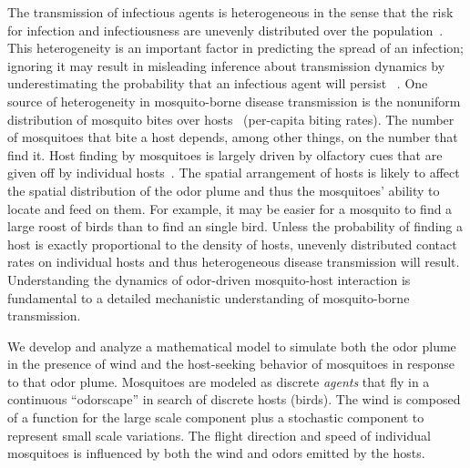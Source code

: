 \documentclass[12pt]{article}
\begin{document}
The transmission of infectious agents is heterogeneous in the sense that the risk for infection and infectiousness are unevenly distributed over the population~\cite{Woolhouse1997}. This heterogeneity is an important factor in predicting the spread of an infection; ignoring it may result in misleading inference about transmission dynamics by underestimating the probability that an infectious agent will persist ~\cite{Hasibeder1988}.  One source of heterogeneity in mosquito-borne disease transmission is the nonuniform distribution of mosquito bites over hosts~\cite{Dye1986} (per-capita biting rates). The number of mosquitoes that bite a host depends, among other things, on the number that find it.
Host finding by mosquitoes is largely driven by olfactory cues that are given off by individual
hosts~\cite{Lehane1991}.
The spatial arrangement of hosts is likely to affect the spatial distribution of the odor plume and thus the mosquitoes' ability to locate and feed on them. For example, it may be easier for a mosquito to find a large roost of birds than to find an single bird.  Unless the probability of finding a host is exactly proportional to the density of hosts, unevenly distributed contact rates on individual hosts and thus heterogeneous disease transmission will result.  Understanding the dynamics of odor-driven mosquito-host interaction is fundamental to a detailed mechanistic understanding of mosquito-borne transmission.

%

We develop and analyze a mathematical model
to simulate  both the odor plume in the presence of wind and the host-seeking behavior of mosquitoes in response to that odor plume. Mosquitoes are modeled as discrete {\em agents} that fly in a continuous ``odorscape'' in search of  discrete hosts (birds).
The wind is composed of a function for the large scale component plus
a stochastic component to represent small scale variations.
The flight direction and speed of individual mosquitoes is influenced by both the wind and odors
emitted by the hosts.
\end{document}
